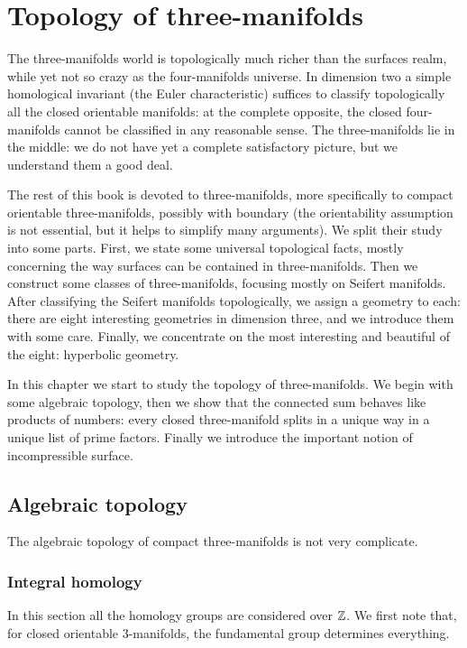 \chapter{Topology of three-manifolds} \label{Three:topology:chapter}

The three-manifolds world is topologically much richer than the surfaces realm, while yet not so crazy as the four-manifolds universe. In dimension two a simple homological invariant (the Euler characteristic) suffices to classify topologically all the closed orientable manifolds: at the complete opposite, the closed four-manifolds cannot be classified in any reasonable sense. The three-manifolds lie in the middle: we do not have yet a complete satisfactory picture, but we understand them a good deal.

The rest of this book is devoted to three-manifolds, more specifically to compact orientable three-manifolds, possibly with boundary (the orientability assumption is not essential, but it helps to simplify many arguments). We split their study into some parts. First, we state some universal topological facts, mostly concerning the way surfaces can be contained in three-manifolds. Then we construct some classes of three-manifolds, focusing mostly on Seifert manifolds. After classifying the Seifert manifolds topologically, we assign a geometry to each: there are eight interesting geometries in dimension three, and we introduce them with some care. Finally, we concentrate on the most interesting and beautiful of the eight: hyperbolic geometry.

In this chapter we start to study the topology of three-manifolds. We begin with some algebraic topology, then we show that the connected sum behaves like products of numbers: every closed three-manifold splits in a unique way in a unique list of prime factors. Finally we introduce the important notion of incompressible surface.

\section{Algebraic topology}
The algebraic topology of compact three-manifolds is not very complicate. 

\subsection{Integral homology}
In this section all the homology groups are considered over $\mathbb{Z}$. We first note that, for closed orientable 3-manifolds, the fundamental group determines everything.

